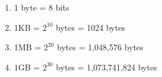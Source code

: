 \begin{enumerate}
    \item 1 byte = 8 bits
    \item 1KB = $2^{10}$ bytes = 1024 bytes
    \item 1MB = $2^{20}$ bytes = 1,048,576 bytes
    \item 1GB = $2^{30}$ bytes = 1,073,741,824 bytes
\end{enumerate}
